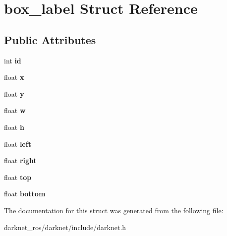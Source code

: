 \hypertarget{structbox__label}{}\section{box\+\_\+label Struct Reference}
\label{structbox__label}
\subsection*{Public Attributes}
\begin{DoxyCompactItemize}
\item 
\mbox{\label{structbox__label_a70328738c0d38547cd93d2fa59310a31}} 
int {\bfseries id}
\item 
\mbox{\label{structbox__label_a50bbc824640977cfbd11b7d129c488d3}} 
float {\bfseries x}
\item 
\mbox{\label{structbox__label_ae188dc93ed34cce2910afcd3b5e43730}} 
float {\bfseries y}
\item 
\mbox{\label{structbox__label_ad866cd941fd0704a6ab79c068d3b2aff}} 
float {\bfseries w}
\item 
\mbox{\label{structbox__label_a16f7c9ecdbd1919c153e7b3aa07f8d64}} 
float {\bfseries h}
\item 
\mbox{\label{structbox__label_adbd27415d605f29a7022298fd615ed75}} 
float {\bfseries left}
\item 
\mbox{\label{structbox__label_a4c7c88557656ba121f112021522b5837}} 
float {\bfseries right}
\item 
\mbox{\label{structbox__label_a1f60ec698e94e15cc51a2d5d9e07126c}} 
float {\bfseries top}
\item 
\mbox{\label{structbox__label_a284fc060d46feacdf929ec53dca7c643}} 
float {\bfseries bottom}
\end{DoxyCompactItemize}


The documentation for this struct was generated from the following file\+:\begin{DoxyCompactItemize}
\item 
darknet\+\_\+ros/darknet/include/darknet.\+h\end{DoxyCompactItemize}
